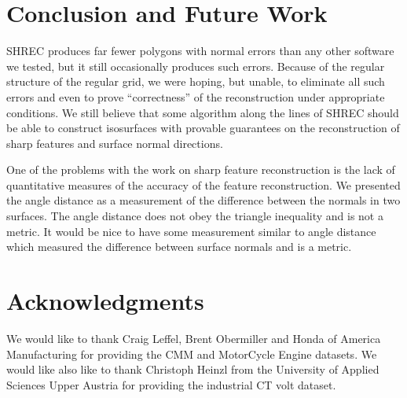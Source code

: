 
\section{Conclusion and Future Work}
\label{section:conclusion}

SHREC produces far fewer polygons with normal errors 
than any other software we tested,
but it still occasionally produces such errors.
Because of the regular structure of the regular grid,
we were hoping, but unable, to eliminate all such errors
and even to prove ``correctness'' of the reconstruction
under appropriate conditions.
We still believe that some algorithm along the lines of SHREC
should be able to construct isosurfaces with provable
guarantees on the reconstruction of sharp features
and surface normal directions.

One of the problems with the work on sharp feature reconstruction
is the lack of quantitative measures of the accuracy 
of the feature reconstruction.
We presented the angle distance as a measurement of the difference
between the normals in two surfaces.
The angle distance does not obey the triangle inequality
and is not a metric.
It would be nice to have some measurement similar to angle distance
which measured the difference between surface normals
and is a metric.


\section{Acknowledgments}

We would like to thank Craig Leffel, Brent Obermiller 
and Honda of America Manufacturing
for providing the CMM and MotorCycle Engine datasets.
We would like also like to thank Christoph Heinzl
from the University of Applied Sciences Upper Austria
for providing the industrial CT volt dataset.

